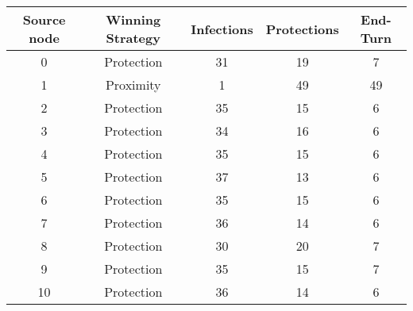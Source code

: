 \documentclass[results.tex]{subfiles}
\begin{document}
    \begin{center}
        \begin{tabular}{| c || c | c | c | c |}
            \hline
            {\bfseries Source node} & {\bfseries Winning Strategy} & {\bfseries Infections} & {\bfseries Protections}
            & {\bfseries End-Turn}
            \\  %
            \hline\hline
            0                       & Protection                   & 31                     & 19                      & 7                    \\
            \hline
            1                       & Proximity                    & 1                      & 49                      & 49                   \\
            \hline
            2                       & Protection                   & 35                     & 15                      & 6                    \\
            \hline
            3                       & Protection                   & 34                     & 16                      & 6                    \\
            \hline
            4                       & Protection                   & 35                     & 15                      & 6                    \\
            \hline
            5                       & Protection                   & 37                     & 13                      & 6                    \\
            \hline
            6                       & Protection                   & 35                     & 15                      & 6                    \\
            \hline
            7                       & Protection                   & 36                     & 14                      & 6                    \\
            \hline
            8                       & Protection                   & 30                     & 20                      & 7                    \\
            \hline
            9                       & Protection                   & 35                     & 15                      & 7                    \\
            \hline
            10                      & Protection                   & 36                     & 14                      & 6                    \\

\end{tabular}
\end{center}
\end{document}
